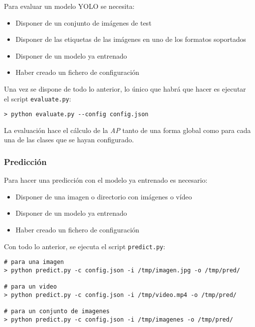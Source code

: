 Para evaluar un modelo YOLO se necesita:

\begin{itemize}
	\item Disponer de un conjunto de imágenes de test
	\item Disponer de las etiquetas de las imágenes en uno de los formatos soportados
	\item Disponer de un modelo ya entrenado
	\item Haber creado un fichero de configuración
\end{itemize}

Una vez se dispone de todo lo anterior, lo único que habrá que hacer es ejecutar el script \texttt{evaluate.py}:

\begin{lstlisting}[frame=single, basicstyle=\ttfamily\footnotesize, caption={Cómo evaluar un modelo entrenado}, captionpos=b]
> python evaluate.py --config config.json
\end{lstlisting}

La evaluación hace el cálculo de la \textit{AP} tanto de una forma global como para cada una de las clases que se hayan configurado.

\subsubsection*{Predicción}

Para hacer una predicción con el modelo ya entrenado es necesario:

\begin{itemize}
	\item Disponer de una imagen o directorio con imágenes o vídeo
	\item Disponer de un modelo ya entrenado
	\item Haber creado un fichero de configuración
\end{itemize}

Con todo lo anterior, se ejecuta el script \texttt{predict.py}:

\begin{lstlisting}[frame=single, basicstyle=\ttfamily\footnotesize, caption={Cómo hacer una predicción con un modelo entrenado}, captionpos=b]
# para una imagen
> python predict.py -c config.json -i /tmp/imagen.jpg -o /tmp/pred/

# para un video
> python predict.py -c config.json -i /tmp/video.mp4 -o /tmp/pred/

# para un conjunto de imagenes
> python predict.py -c config.json -i /tmp/imagenes -o /tmp/pred/
\end{lstlisting}

